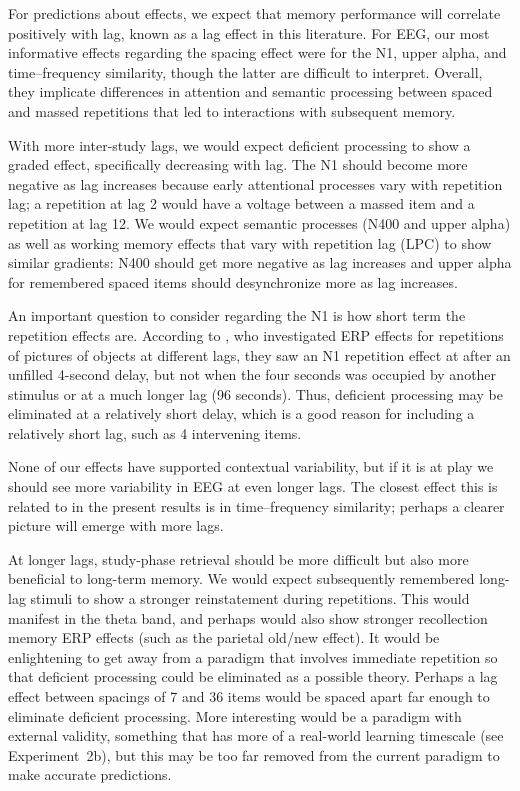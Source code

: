 For predictions about effects, we expect that memory performance will correlate positively with lag, known as a lag effect in this literature.  For EEG, our most informative effects regarding the spacing effect were for the N1, upper alpha, and time--frequency similarity, though the latter are difficult to interpret.  Overall, they implicate differences in attention and semantic processing between spaced and massed repetitions that led to interactions with subsequent memory.

With more inter-study lags, we would expect deficient processing to show a graded effect, specifically decreasing with lag.  The N1 should become more negative as lag increases because early attentional processes vary with repetition lag; a repetition at lag 2 would have a voltage between a massed item and a repetition at lag 12.  We would expect semantic processes (N400 and upper alpha) as well as working memory effects that vary with repetition lag (LPC) to show similar gradients: N400 should get more negative as lag increases and upper alpha for remembered spaced items should desynchronize more as lag increases.

An important question to consider regarding the N1 is how short term the repetition effects are.  According to , who investigated ERP effects for repetitions of pictures of objects at different lags, they saw an N1 repetition effect at after an unfilled 4-second delay, but not when the four seconds was occupied by another stimulus or at a much longer lag (96 seconds).  Thus, deficient processing may be eliminated at a relatively short delay, which is a good reason for including a relatively short lag, such as 4 intervening items.

None of our effects have supported contextual variability, but if it is at play we should see more variability in EEG at even longer lags.  The closest effect this is related to in the present results is in time--frequency similarity; perhaps a clearer picture will emerge with more lags.

At longer lags, study-phase retrieval should be more difficult but also more beneficial to long-term memory.  We would expect subsequently remembered long-lag stimuli to show a stronger reinstatement during repetitions.  This would manifest in the theta band, and perhaps would also show stronger recollection memory ERP effects (such as the parietal old/new effect).
It would be enlightening to get away from a paradigm that involves immediate repetition so that deficient processing could be eliminated as a possible theory.  Perhaps a lag effect between spacings of 7 and 36 items would be spaced apart far enough to eliminate deficient processing.  More interesting would be a paradigm with external validity, something that has more of a real-world learning timescale (see Experiment~2b), but this may be too far removed from the current paradigm to make accurate predictions.

